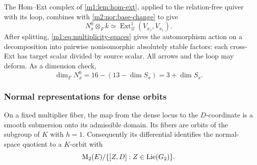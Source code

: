 The Hom--Ext complex of \cref{m1:lem:hom-ext}, applied to the
relation-free quiver with its loop, combines with
\eqref{m2:nor:base-change} to give
\begin{equation}\label{m2:nor:hom-ext}
 N_x^0\otimes_F k\simeq
 \operatorname{Ext}^1_{\mathscr Q}(V_{x_1},V_{x_1}).
\end{equation}
After splitting, \eqref{m1:eq:multiplicity-spaces} gives the
automorphism action on a decomposition into pairwise nonisomorphic
absolutely stable factors: each cross-Ext has target scalar divided
by source scalar. All arrows and the loop may deform.
As a dimension check,
\begin{equation}\label{m2:nor:dimension-check}
 \dim_F N_x^0=16-(13-\dim S_x)=3+\dim S_x.
\end{equation}

\subsubsection{Normal representations for dense orbits}

\begin{lemma}\label{m2:rat:dense-smooth}
On a fixed multiplier fiber, the map from the dense locus to
the $D$-coordinate is a smooth submersion onto its admissible
domain.  Its fibers are orbits of the subgroup of $K$ with
$h=1$.  Consequently its differential identifies the normal-space
quotient to a $K$-orbit with
\[
 \operatorname{M}_2(E)/\{[Z,D]:Z\in\operatorname{Lie}(G_2)\}.
\]
\end{lemma}

